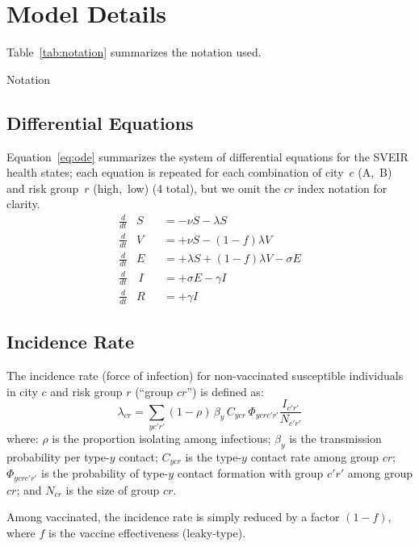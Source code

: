 \section{Model Details}\label{app.model}
Table~\ref{tab:notation} summarizes the notation used.
\begin{table}[h]
  \centering
  \caption{Notation}
  \label{tab:notation}
  
\end{table}
\subsection{Differential Equations}\label{app.model.eqn}
Equation~\eqref{eq:ode} summarizes the system of differential equations for the SVEIR health states;
each equation is repeated for each combination of city~$c$ (A,~B) and risk group~$r$ (high,~low) (4 total),
but we omit the $cr$ index notation for clarity.
\begin{subequations}\label{eq:ode}
  \begin{alignat}{5}
    \frac{d}{dt}&S   &&= - \nu S - \lambda S \\
    \frac{d}{dt}&V   &&= + \nu S - (1 - f) \lambda V \\
    \frac{d}{dt}&E   &&= + \lambda S + (1-f) \lambda V - \sigma E\\
    \frac{d}{dt}&\,I &&= + \sigma E - \gamma I \\
    \frac{d}{dt}&R   &&= + \gamma I
  \end{alignat}
\end{subequations}
\subsection{Incidence Rate}\label{app.model.inc}
The incidence rate (force of infection) for
non-vaccinated susceptible individuals in city $c$ and risk group $r$ (``group $cr$'') is defined as:
\begin{equation}
  \lambda_{cr} = \sum_{yc'r'} (1 - \rho)\,\beta_{y}\,C_{ycr}\,\Phi_{ycrc'r'} \frac{I_{c'r'}}{N_{c'r'}}
\end{equation}
where:
$\rho$ is the proportion isolating among infectious;
$\beta_{y}$ is the transmission probability per type-$y$ contact;
$C_{ycr}$ is the type-$y$ contact rate among group $cr$;
$\Phi_{ycrc'r'}$ is the probability of type-$y$ contact formation with group $c'r'$ among group $cr$; and
$N_{cr}$ is the size of group $cr$.
\par
Among vaccinated, the incidence rate is simply reduced by a factor $(1-f)$, where
$f$ is the vaccine effectiveness (leaky-type).
